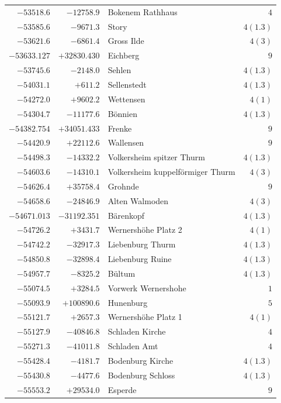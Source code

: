 \begin{center}
\begin{tabular}{r|r|p{170pt}|r}
\(-53518.6\)&\(-12758.9\)&Bokenem Rathhaus&\(4\)\\
\(-53585.6\)&\(-9671.3\)&Story&\(4(1.3)\)\\
\(-53621.6\)&\(-6861.4\)&Gross Ilde&\(4 (3)\)\\
\(-53633.127\)&\(+32830.430\)&Eichberg&\(9\)\\
\(-53745.6\)&\(-2148.0\)&Sehlen&\(4(1.3)\)\\
\(-54031.1\)&\(+611.2\)&Sellenstedt&\(4(1.3)\)\\
\(-54272.0\)&\(+9602.2\)&Wettensen&\(4 (1)\)\\
\(-54304.7\)&\(-11177.6\)&Bönnien&\(4(1.3)\)\\
\(-54382.754\)&\(+34051.433\)&Frenke&\(9\)\\
\(-54420.9\)&\(+22112.6\)&Wallensen&\(9\)\\
\(-54498.3\)&\(-14332.2\)&Volkersheim spitzer Thurm&\(4(1.3)\)\\
\(-54603.6\)&\(-14310.1\)&Volkersheim kuppelförmiger Thurm&\(4 (3)\)\\
\(-54626.4\)&\(+35758.4\)&Grohnde&\(9\)\\
\(-54658.6\)&\(-24846.9\)&Alten Walmoden&\(4(3)\)\\
\(-54671.013\)&\(-31192.351\)&Bärenkopf&\(4(1.3)\)\\
\(-54726.2\)&\(+3431.7\)&Wernershöhe Platz 2&\(4 (1)\)\\
\(-54742.2\)&\(-32917.3\)&Liebenburg Thurm&\(4(1.3)\)\\
\(-54850.8\)&\(-32898.4\)&Liebenburg Ruine&\(4(1.3)\)\\
\(-54957.7\)&\(-8325.2\)&Bültum&\(4(1.3)\)\\
\(-55074.5\)&\(+3284.5\)&Vorwerk Wernershohe&\(1\)\\
\(-55093.9\)&\(+100890.6\)&Hunenburg&\(5\)\\
\(-55121.7\)&\(+2657.3\)&Wernershöhe Platz 1&\(4(1)\)\\
\(-55127.9\)&\(-40846.8\)&Schladen Kirche&\(4\)\\
\(-55271.3\)&\(-41011.8\)&Schladen Amt&\(4\)\\
\(-55428.4\)&\(-4181.7\)&Bodenburg Kirche&\(4(1.3)\)\\
\(-55430.8\)&\(-4477.6\)&Bodenburg Schloss&\(4(1.3)\)\\
\(-55553.2\)&\(+29534.0\)&Esperde&\(9\)\\
\hline\end{tabular}\endgroup\end{center}
